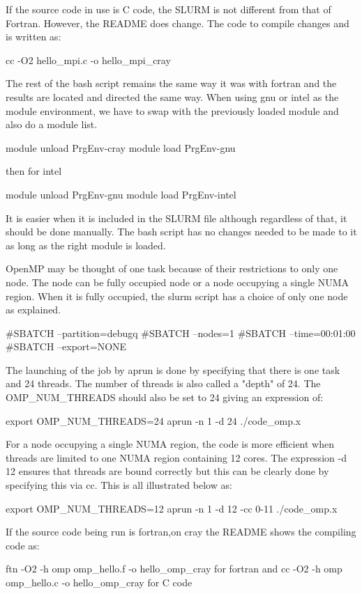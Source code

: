 \begin{Document}
{If the source code in use is C code, the SLURM is not different from that of Fortran. However, the README does change. 
The code to compile changes and is written as:

cc -O2 hello_mpi.c -o hello_mpi_cray

The rest of the bash script remains the same way it was with fortran and the results are located and directed the same way.
When using gnu or intel as the module environment, we have to swap with the previously loaded module and also do a module list. 

module unload PrgEnv-cray
module load PrgEnv-gnu

then for intel

module unload PrgEnv-gnu
module load PrgEnv-intel

It is easier when it is included in the SLURM file although regardless of that, it should be done manually.
The bash script has no changes needed to be made to it as long as the right module is loaded.



OpenMP may be thought of one task because of their restrictions to only one node.
The node can be fully occupied node or a node occupying a single NUMA region.
When it is fully occupied, the slurm script has a choice of only one node as explained.

#SBATCH --partition=debugq
#SBATCH --nodes=1
#SBATCH --time=00:01:00
#SBATCH --export=NONE

The launching of the job by aprun is done by specifying that there is one task and 24 threads. 
The number of threads is also called a "depth" of 24.
The OMP_NUM_THREADS should also be set to 24 giving an expression of:

export OMP_NUM_THREADS=24
aprun -n 1 -d 24 ./code_omp.x

For a node occupying a single NUMA region, the code is more efficient when threads are limited to one NUMA region containing 12 cores. 
The expression -d 12 ensures that threads are bound correctly but this can be clearly done by specifying this via cc.
This is all illustrated below as:

export OMP_NUM_THREADS=12
aprun -n 1 -d 12 -cc 0-11 ./code_omp.x

If the source code being run is fortran,on cray the README shows the compiling code as:

ftn -O2 -h omp omp_hello.f -o hello_omp_cray for fortran and
cc -O2 -h omp omp_hello.c -o hello_omp_cray for C code

}
\end{Document}

